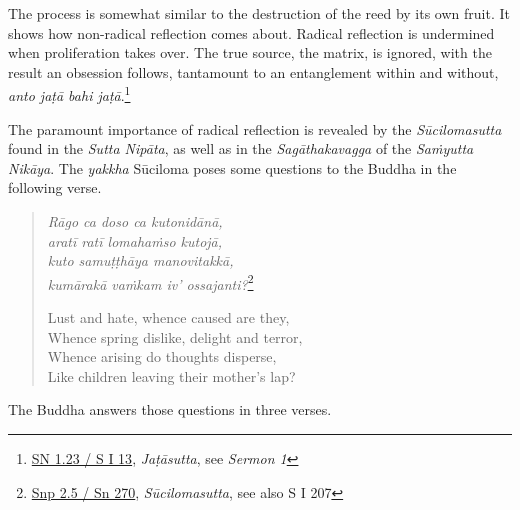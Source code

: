 The process is somewhat similar to the destruction of the reed by its own fruit. It shows how non-radical reflection comes about. Radical reflection is undermined when proliferation takes over. The true source, the matrix, is ignored, with the result an obsession follows, tantamount to an entanglement within and without, \emph{anto jaṭā bahi jaṭā}.\footnote{\href{https://suttacentral.net/sn1.23/pli/ms}{SN 1.23 / S I 13}, \emph{Jaṭāsutta}, see \emph{Sermon 1}}

The paramount importance of radical reflection is revealed by the \emph{Sūcilomasutta} found in the \emph{Sutta Nipāta}, as well as in the \emph{Sagāthakavagga} of the \emph{Saṁyutta Nikāya}. The \emph{yakkha} Sūciloma poses some questions to the Buddha in the following verse.

\begin{quote}
\emph{Rāgo ca doso ca kutonidānā,}\\
\emph{aratī ratī lomahaṁso kutojā,}\\
\emph{kuto samuṭṭhāya manovitakkā,}\\
\emph{kumārakā vaṁkam iv' ossajanti?}\footnote{\href{https://suttacentral.net/snp2.5/pli/ms}{Snp 2.5 / Sn 270}, \emph{Sūcilomasutta}, see also S I 207}

Lust and hate, whence caused are they,\\
Whence spring dislike, delight and terror,\\
Whence arising do thoughts disperse,\\
Like children leaving their mother's lap?
\end{quote}

The Buddha answers those questions in three verses.

